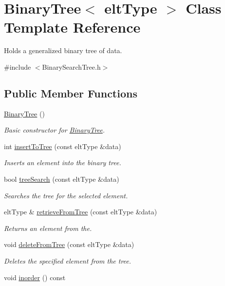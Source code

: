 \hypertarget{classBinaryTree}{\section{Binary\-Tree$<$ elt\-Type $>$ Class Template Reference}
\label{classBinaryTree}
}


Holds a generalized binary tree of data.  




{\ttfamily \#include $<$Binary\-Search\-Tree.\-h$>$}

\subsection*{Public Member Functions}
\begin{DoxyCompactItemize}
\item 
\hypertarget{classBinaryTree_adde2bcc613cebcf3bd4e681806175567}{\hyperlink{classBinaryTree_adde2bcc613cebcf3bd4e681806175567}{Binary\-Tree} ()}\label{classBinaryTree_adde2bcc613cebcf3bd4e681806175567}

\begin{DoxyCompactList}\small\item\em Basic constructor for \hyperlink{classBinaryTree}{Binary\-Tree}. \end{DoxyCompactList}\item 
int \hyperlink{classBinaryTree_afb14a5380e1204fe352075b013618ac3}{insert\-To\-Tree} (const elt\-Type \&data)
\begin{DoxyCompactList}\small\item\em Inserts an element into the binary tree. \end{DoxyCompactList}\item 
bool \hyperlink{classBinaryTree_a99fdf05dd327c4268cd0903799dd5a1a}{tree\-Search} (const elt\-Type \&data)
\begin{DoxyCompactList}\small\item\em Searches the tree for the selected element. \end{DoxyCompactList}\item 
elt\-Type \& \hyperlink{classBinaryTree_ac57eed7f7dc8db789f2a865927404d92}{retrieve\-From\-Tree} (const elt\-Type \&data)
\begin{DoxyCompactList}\small\item\em Returns an element from the. \end{DoxyCompactList}\item 
void \hyperlink{classBinaryTree_acb6d90ef9addab70a44658f5612d6b34}{delete\-From\-Tree} (const elt\-Type \&data)
\begin{DoxyCompactList}\small\item\em Deletes the specified element from the tree. \end{DoxyCompactList}\item 
\hypertarget{classBinaryTree_a1a38ec31c939f0c6fd914634acb4f6f1}{void \hyperlink{classBinaryTree_a1a38ec31c939f0c6fd914634acb4f6f1}{inorder} () const }\label{classBinaryTree_a1a38ec31c939f0c6fd914634acb4f6f1}


\end{DoxyCompactItemize}
